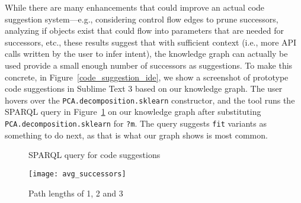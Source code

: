 While there are many enhancements that could improve an actual code suggestion system---e.g., considering control flow edges to prune successors, analyzing if objects exist that could flow into parameters that are needed for successors, etc., these results suggest that with sufficient context (i.e., more API calls written by the user to infer intent), the knowledge graph can actually be used provide a small enough number of successors as suggestions.  To make this concrete, in Figure~\ref{code_suggestion_ide}, we show a screenshot of prototype code suggestions in Sublime Text 3 based on our knowledge graph.  The user hovers over the {\tt PCA.decomposition.sklearn} constructor, and the tool runs the SPARQL query in Figure~\ref{code:code_suggestion_sparql} on our knowledge graph after substituting {\tt PCA.decomposition.sklearn} for {\tt ?m}.   The query suggests {\tt fit} variants as something to do next, as that is what our graph shows is most common.

\begin{figure}[htb]
\begin{centering}

\caption{SPARQL query for code suggestions}
\label{code:code_suggestion_sparql}
\end{centering}
\end{figure}

\begin{figure}
\centering 
{\texttt{[image: avg\_successors]}}
\caption{Path lengths of 1, 2 and 3}
\label{cross_validate_means}
\end{figure}

